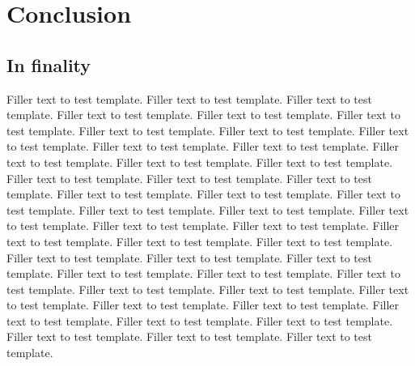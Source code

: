 
\chapter{Conclusion}

\section{In finality}

Filler text to test template. Filler text to test template. Filler text to
test template. Filler text to test template. Filler text to test template.
Filler text to test template. Filler text to test template. Filler text to
test template. Filler text to test template. Filler text to test template.
Filler text to test template. Filler text to test template. Filler text to
test template. Filler text to test template. Filler text to test template.
Filler text to test template. Filler text to test template. Filler text to
test template. Filler text to test template. Filler text to test template.
Filler text to test template. Filler text to test template. Filler text to
test template. Filler text to test template. Filler text to test template.
Filler text to test template. Filler text to test template. Filler text to
test template. Filler text to test template. Filler text to test template.
Filler text to test template. Filler text to test template. Filler text to
test template. Filler text to test template. Filler text to test template.
Filler text to test template. Filler text to test template. Filler text to
test template. Filler text to test template. Filler text to test template.
Filler text to test template. Filler text to test template. Filler text to
test template. Filler text to test template. Filler text to test template.

